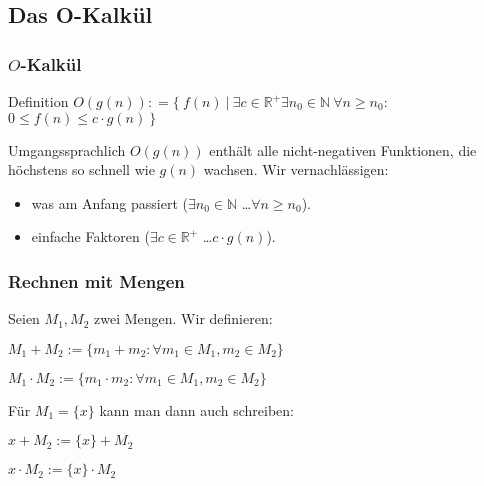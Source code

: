 \subsection{Das O-Kalkül}
\begin{frame}
  \frametitle{$O$-Kalkül}
    \begin{block}{Definition}
          $O(g(n)): =\{\ f(n)\ |\ \exists c \in \mathbb{R}^+ \exists n_{0} \in \mathbb{N}\ \forall n \ge n_{0}:$\\
          \hspace{9em} $0 \le f(n) \le c\cdot g(n)\ \}$
    \end{block}

  \begin{alertblock}{Umgangssprachlich}
    $O(g(n))$ enthält alle nicht-negativen Funktionen, die höchstens so schnell wie $g(n)$ wachsen.
    Wir vernachlässigen:
    \begin{itemize}
      \item was am Anfang passiert ($\exists n_0\in\mathbb{N}$ \ldots $\forall n\ge n_0$).
      \item einfache Faktoren ($\exists c\in\mathbb{R}^+$ \ldots $c\cdot g(n)$).
    \end{itemize}
  \end{alertblock}
\end{frame}

\begin{frame}
  \frametitle{Rechnen mit Mengen}
  \begin{definition}
    Seien $M_1, M_2$ zwei Mengen. Wir definieren:
    \begin{description}
      \item $M_1 + M_2 := \{m_1 + m_2 : \forall m_1 \in M_1, m_2 \in M_2\}$
      \item $M_1 \cdot M_2 := \{m_1 \cdot  m_2 : \forall m_1 \in M_1, m_2 \in M_2\}$
    \end{description}
    Für $M_1 = \{x\}$ kann man dann auch schreiben:
    \begin{description}
      \item $x + M_2 := \{x\} + M_2$
      \item $x \cdot M_2 := \{x\} \cdot M_2$
    \end{description}
  \end{definition}
\end{frame}

